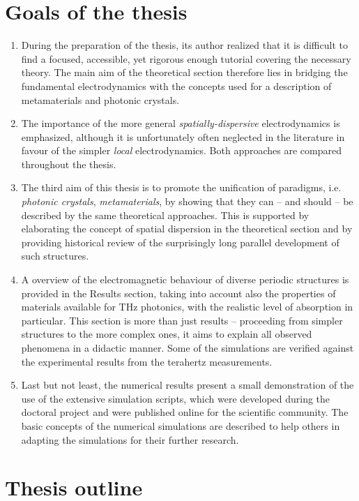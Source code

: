 
\section{Goals of the thesis}%
\begin{enumerate}
\item{During the preparation of the thesis, its author realized that it is difficult to find a focused, accessible, yet rigorous enough tutorial covering the necessary theory. The main aim of the theoretical section therefore lies in bridging the fundamental electrodynamics with the concepts used for a description of metamaterials and photonic crystals.} 
\item{The importance of the more general \textit{spatially-dispersive} electrodynamics is emphasized, although it is unfortunately often neglected in the literature in favour of the simpler \textit{local} electrodynamics. Both approaches are compared throughout the thesis.} 
\item{The third aim of this thesis is to promote the unification of paradigms, i.e. \textit{photonic crystals}, \textit{metamaterials}, by showing that they can -- and should -- be described by the same theoretical approaches. This is supported by elaborating the concept of spatial dispersion in the theoretical section and by providing historical review of the surprisingly long parallel development of such structures.} 
\item{A overview of the electromagnetic behaviour of diverse periodic structures is provided in the Results section, taking into account also the properties of materials available for THz photonics, with the realistic level of absorption in particular. This section is more than just results -- proceeding from simpler structures to the more complex ones, it aims to explain all observed phenomena in a didactic manner. Some of the simulations are verified against the experimental results from the terahertz measurements.} 
\item{Last but not least, the numerical results present a small demonstration of the use of the extensive simulation scripts, which were developed during the doctoral project and were published online for the scientific community. The basic concepts of the numerical simulations are described to help others in adapting the simulations for their further research. } 
\end{enumerate}
\section{Thesis outline}
